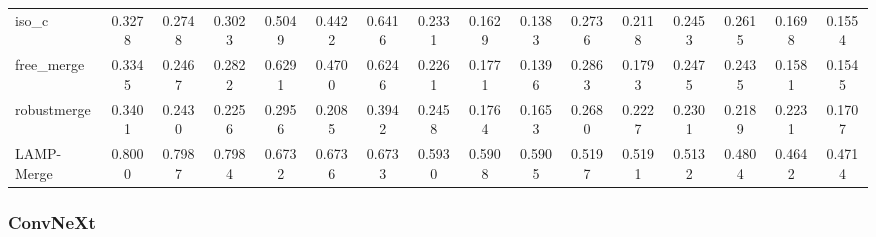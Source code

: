\documentclass[letterpaper]{article}
\begin{document}
\begin{table}[t]
{\begin{tabular}{lccccccccccccccc}
iso\_c & 0.3278 & 0.2748 & 0.3023 & 0.5049 & 0.4422 & 0.6416 & 0.2331 & 0.1629 & 0.1383 & 0.2736 & 0.2118 & 0.2453 & 0.2615 & 0.1698 & 0.1554 \\
free\_merge & 0.3345 & 0.2467 & 0.2822 & 0.6291 & 0.4700 & 0.6246 & 0.2261 & 0.1771 & 0.1396 & 0.2863 & 0.1793 & 0.2475 & 0.2435 & 0.1581 & 0.1545 \\
robustmerge & 0.3401 & 0.2430 & 0.2256 & 0.2956 & 0.2085 & 0.3942 & 0.2458 & 0.1764 & 0.1653 & 0.2680 & 0.2227 & 0.2301 & 0.2189 & 0.2231 & 0.1707 \\
LAMP-Merge & 0.8000 & 0.7987 & 0.7984 & 0.6732 & 0.6736 & 0.6733 & 0.5930 & 0.5908 & 0.5905 & 0.5197 & 0.5191 & 0.5132 & 0.4804 & 0.4642 & 0.4714 \\
\bottomrule
\end{tabular}%
}
\end{table}

\subsubsection{ConvNeXt}
\end{document}
